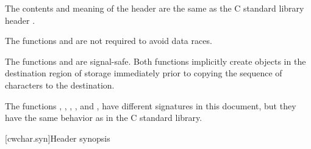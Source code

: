 \pnum
The contents and meaning of the header 
are the same as the C standard library header .

\pnum
The functions  and  are not required to avoid data
races.

\pnum
{}%
%
The functions  and  are signal-safe.
Both functions implicitly create objects
in the destination region of storage
immediately prior to copying the sequence of characters to the destination.

\pnum
\begin{note}
The functions
, , , , and ,
have different signatures in this document,
but they have the same behavior as in the C standard library.
\end{note}


[cwchar.syn]{Header  synopsis}

